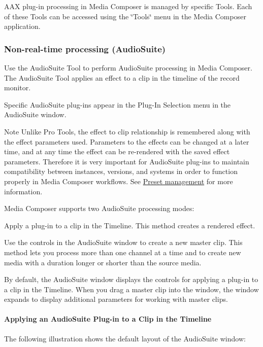 A\+A\+X plug-\/in processing in Media Composer is managed by specific Tools. Each of these Tools can be accessed using the \char`\"{}\+Tools\char`\"{} menu in the Media Composer application.

\hypertarget{a00361_subsection__media_composer_guide__audiosuite}{}\subsubsection{Non-\/real-\/time processing (\+Audio\+Suite)}\label{a00361_subsection__media_composer_guide__audiosuite}
 Use the Audio\+Suite Tool to perform Audio\+Suite processing in Media Composer. The Audio\+Suite Tool applies an effect to a clip in the timeline of the record monitor.

Specific Audio\+Suite plug-\/ins appear in the Plug-\/\+In Selection menu in the Audio\+Suite window.

\begin{DoxyNote}{Note}
Unlike Pro Tools, the effect to clip relationship is remembered along with the effect parameters used. Parameters to the effects can be changed at a later time, and at any time the effect can be re-\/rendered with the saved effect parameters. Therefore it is very important for Audio\+Suite plug-\/ins to maintain compatibility between instances, versions, and systems in order to function properly in Media Composer workflows. See \hyperlink{a00361_subsection__aax_media_composer_guide__features__presets}{Preset management} for more information.
\end{DoxyNote}
Media Composer supports two Audio\+Suite processing modes\+: 
\begin{DoxyItemize}
\item Apply a plug-\/in to a clip in the Timeline. This method creates a rendered effect.  
\item Use the controls in the Audio\+Suite window to create a new master clip. This method lets you process more than one channel at a time and to create new media with a duration longer or shorter than the source media.  
\end{DoxyItemize}

By default, the Audio\+Suite window displays the controls for applying a plug-\/in to a clip in the Timeline. When you drag a master clip into the window, the window expands to display additional parameters for working with master clips.

\hypertarget{a00361_subsubsection__media_composer_guide__audiosuite_apply_to_clip}{}\paragraph{Applying an Audio\+Suite Plug-\/in to a Clip in the Timeline}\label{a00361_subsubsection__media_composer_guide__audiosuite_apply_to_clip}
 The following illustration shows the default layout of the Audio\+Suite window\+:

